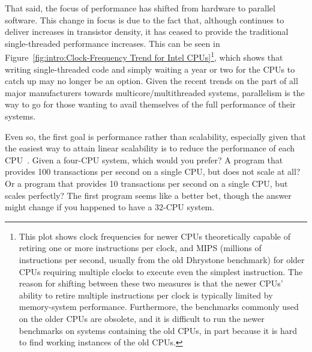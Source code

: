 That said, the focus of performance has shifted from hardware to
parallel software.
This change in focus is due to the fact that, although 
continues to deliver increases in transistor density, it has ceased to
provide the traditional single-threaded performance increases.
This can be seen in
Figure~\ref{fig:intro:Clock-Frequency Trend for Intel CPUs}\footnote{
	This plot shows clock frequencies for newer CPUs theoretically
	capable of retiring one or more instructions per clock, and MIPS
	(millions of instructions per second, usually from the old
	Dhrystone benchmark)
	for older CPUs requiring multiple clocks to execute even the
	simplest instruction.
	The reason for shifting between these two measures is that the
	newer CPUs' ability to retire multiple instructions per clock is
	typically limited by memory-system performance.
	Furthermore, the benchmarks commonly used on the older CPUs
	are obsolete, and it is difficult to run the newer benchmarks
	on systems containing the old CPUs, in part because it is hard
	to find working instances of the old CPUs.},
which shows that writing single-threaded code and simply waiting
a year or two for the CPUs to catch up may no longer be an option.
Given the recent trends on the part of all major manufacturers towards
multicore/multithreaded systems, parallelism is the way to go for
those wanting to avail themselves of the full performance of their
systems.

\QuickQuizEnd

Even so, the first goal is performance rather than scalability,
especially given that the easiest way to attain linear scalability
is to reduce the performance of each CPU~\cite{LinusTorvalds2001a}.
Given a four-CPU system, which would you prefer?
A program that provides 100 transactions per second on a single CPU,
but does not scale at all?
Or a program that provides 10 transactions per second on a single CPU,
but scales perfectly?
The first program seems like a better bet, though the answer might
change if you happened to have a 32-CPU system.


